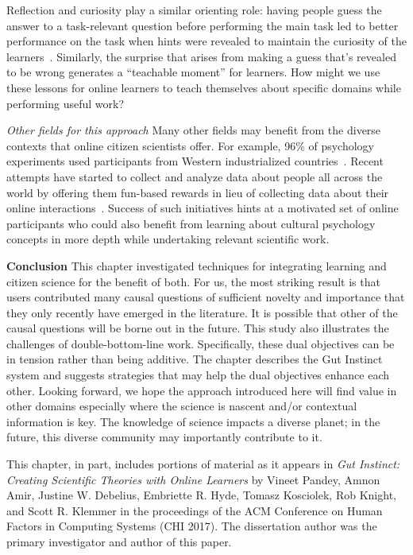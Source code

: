 Reflection and curiosity play a similar orienting role: having people guess the answer to a task-relevant question before performing the main task led to better performance on the task when hints were revealed to maintain the curiosity of the learners~\cite{Aleven2006, Law2016a}. Similarly, the surprise that arises from making a guess that’s revealed to be wrong generates a “teachable moment” for learners. How might we use these lessons for online learners to teach themselves about specific domains while performing useful work? 

\textit{Other fields for this approach}
Many other fields may benefit from the diverse contexts that online citizen scientists offer. For example, 96\% of psychology experiments used participants from Western industrialized countries~\cite{Henrich2010a}. Recent attempts have started to collect and analyze data about people all across the world by offering them fun-based rewards in lieu of collecting data about their online interactions~\cite{Reinecke2015}. Success of such initiatives hints at a motivated set of online participants who could also benefit from learning about cultural psychology concepts in more depth while undertaking relevant scientific work. 

\textbf{Conclusion}
This chapter investigated techniques for integrating learning and citizen science for the benefit of both. For us, the most striking result is that users contributed many causal questions of sufficient novelty and importance that they only recently have emerged in the literature. It is possible that other of the causal questions will be borne out in the future. This study also illustrates the challenges of double-bottom-line work. Specifically, these dual objectives can be in tension rather than being additive. The chapter describes the Gut Instinct system and suggests strategies that may help the dual objectives enhance each other. Looking forward, we hope the approach introduced here will find value in other domains especially where the science is nascent and/or contextual information is key. The knowledge of science impacts a diverse planet; in the future, this diverse community may importantly contribute to it.


This chapter, in part, includes portions of material as it appears in \emph{Gut Instinct: Creating Scientific Theories with Online Learners} by Vineet Pandey, Amnon Amir, Justine W. Debelius, Embriette R. Hyde, Tomasz Kosciolek, Rob Knight, and Scott R. Klemmer in the proceedings of the ACM Conference on Human Factors in Computing Systems (CHI 2017). The dissertation author was the primary investigator and author of this paper.

